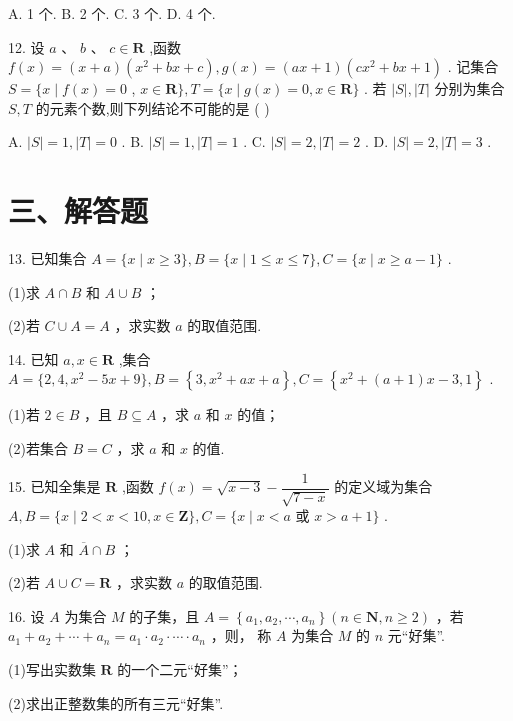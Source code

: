 A. 1 个. B. 2 个. C. 3 个. D. 4 个.

12. 设 $a$ 、 $b$ 、 $c \in  \mathbf{R}$ ,函数 $f\left( x\right)  = \left( {x + a}\right) \left( {{x}^{2} + {bx} + c}\right) ,g\left( x\right)  = \left( {{ax} + 1}\right) \left( {c{x}^{2} + {bx} + 1}\right)$ . 记集合 $S = \{ x \mid  f\left( x\right)  = 0$ , $x \in  \mathbf{R}\} ,T = \{ x \mid  g\left( x\right)  = 0,x \in  \mathbf{R}\}$ . 若 $\left| S\right| ,\left| T\right|$ 分别为集合 $S,T$ 的元素个数,则下列结论不可能的是 ( )

A. $\left| S\right|  = 1,\left| T\right|  = 0$ . B. $\left| S\right|  = 1,\left| T\right|  = 1$ . C. $\left| S\right|  = 2,\left| T\right|  = 2$ . D. $\left| S\right|  = 2,\left| T\right|  = 3$ .

\section*{三、解答题}

13. 已知集合 $A = \{ x \mid  x \geq  3\} ,B = \{ x \mid  1 \leq  x \leq  7\} ,C = \{ x \mid  x \geq  a - 1\}$ .

(1)求 $A \cap  B$ 和 $A \cup  B$ ；

(2)若 $C \cup  A = A$ ，求实数 $a$ 的取值范围.

14. 已知 $a,x \in  \mathbf{R}$ ,集合 $A = \{ 2,4,{x}^{2} - {5x} + 9\} ,B = \left\{  {3,{x}^{2} + {ax} + a}\right\}  ,C = \left\{  {{x}^{2} + \left( {a + 1}\right) x - 3,1}\right\}$ .

(1)若 $2 \in  B$ ，且 $B \subseteq  A$ ，求 $a$ 和 $x$ 的值；

(2)若集合 $B = C$ ，求 $a$ 和 $x$ 的值.

15. 已知全集是 $\mathbf{R}$ ,函数 $f\left( x\right)  = \sqrt{x - 3} - \dfrac{1}{\sqrt{7 - x}}$ 的定义域为集合 $A,B = \{ x \mid  2 < x < {10},x \in  \mathbf{Z}\} ,C = \{ x \mid  x < a$ 或 $x > a + 1\}$ .

(1)求 $A$ 和 $\overline{A} \cap  B$ ；

(2)若 $A \cup  C = \mathbf{R}$ ，求实数 $a$ 的取值范围.

16. 设 $A$ 为集合 $M$ 的子集，且 $A = \left\{  {{a}_{1},{a}_{2},\cdots ,{a}_{n}}\right\}  \left( {n \in  \mathbf{N},n \geq  2}\right)$ ，若 ${a}_{1} + {a}_{2} + \cdots  + {a}_{n} = {a}_{1} \cdot  {a}_{2} \cdot  \cdots  \cdot  {a}_{n}$ ，则， 称 $A$ 为集合 $M$ 的 $n$ 元“好集”.

(1)写出实数集 $\mathbf{R}$ 的一个二元“好集”；

(2)求出正整数集的所有三元“好集”.

